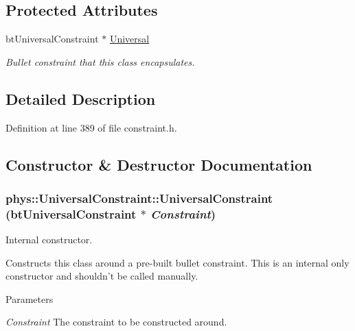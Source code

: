 \subsection*{Protected Attributes}
\begin{DoxyCompactItemize}
\item 
\hypertarget{classphys_1_1UniversalConstraint_ac05eed2dae4f659652d5a5ecd88bacf8}{
btUniversalConstraint $\ast$ \hyperlink{classphys_1_1UniversalConstraint_ac05eed2dae4f659652d5a5ecd88bacf8}{Universal}}
\label{d0/d09/classphys_1_1UniversalConstraint_ac05eed2dae4f659652d5a5ecd88bacf8}

\begin{DoxyCompactList}\small\item\em Bullet constraint that this class encapsulates. \item\end{DoxyCompactList}\end{DoxyCompactItemize}


\subsection{Detailed Description}


Definition at line 389 of file constraint.h.



\subsection{Constructor \& Destructor Documentation}
\hypertarget{classphys_1_1UniversalConstraint_af4d0828590b7fb242f601a171aa5db5f}{
\subsubsection[{UniversalConstraint}]{\setlength{\rightskip}{0pt plus 5cm}phys::UniversalConstraint::UniversalConstraint (btUniversalConstraint $\ast$ {\em Constraint})}}
\label{d0/d09/classphys_1_1UniversalConstraint_af4d0828590b7fb242f601a171aa5db5f}


Internal constructor. 

Constructs this class around a pre-\/built bullet constraint. This is an internal only constructor and shouldn't be called manually. 
\begin{DoxyParams}{Parameters}
\item[{\em Constraint}]The constraint to be constructed around. \end{DoxyParams}


